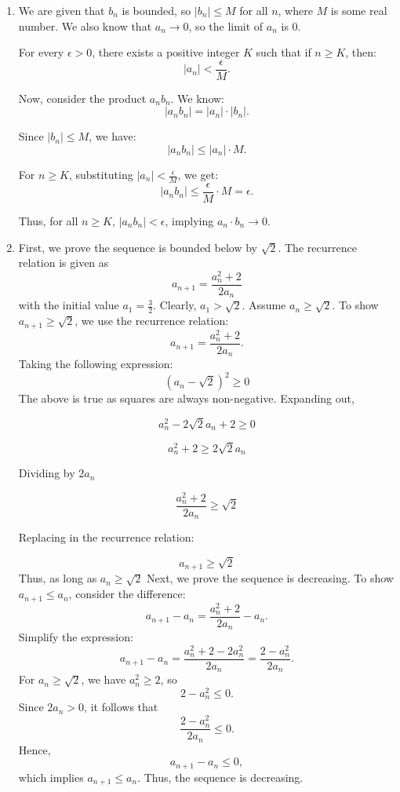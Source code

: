 \documentclass[12pt]{article}
\begin{document}
\begin{enumerate}
\item 
We are given that \(b_n\) is bounded, so \(|b_n| \leq M\) for all \(n\), where \(M\) is some real number. We also know that \(a_n \to 0\), so the limit of \(a_n\) is \(0\).


For every \(\epsilon > 0\), there exists a positive integer \(K\) such that if \(n \geq K\), then:
\[
|a_n| < \frac{\epsilon}{M}.
\]

Now, consider the product \(a_n b_n\). We know:
\[
|a_n b_n| = |a_n| \cdot |b_n|.
\]

Since \(|b_n| \leq M\), we have:
\[
|a_n b_n| \leq |a_n| \cdot M.
\]

For \(n \geq K\), substituting \(|a_n| < \frac{\epsilon}{M}\), we get:
\[
|a_n b_n| \leq \frac{\epsilon}{M} \cdot M = \epsilon.
\]

Thus, for all \(n \geq K\), \(|a_n b_n| < \epsilon\), implying $a_n \cdot b_n \to 0$.

\item First, we prove the sequence is bounded below by \(\sqrt{2}\). The recurrence relation is given as
\[
a_{n+1} = \frac{a_n^2 + 2}{2a_n}
\]
with the initial value \(a_1 = \frac{3}{2}\). Clearly, \(a_1 > \sqrt{2}\). Assume \(a_n \geq \sqrt{2}\). To show \(a_{n+1} \geq \sqrt{2}\), we use the recurrence relation:
\[
a_{n+1} = \frac{a_n^2 + 2}{2a_n}.
\]
Taking the following expression:
\[
(a_n - \sqrt{2})^2 \geq 0
\]
The above is true as squares are always non-negative.
Expanding out,

\[
a^2_{n} -2\sqrt{2}a_n + 2 \geq 0
\]

\[
a^2_{n} + 2 \geq 2\sqrt{2}a_n
\]

Dividing by $2a_n$

\[
\frac{a^2_{n} + 2}{2a_n} \geq \sqrt{2}
\]

Replacing in the recurrence relation:

\[
a_{n+1} \geq \sqrt{2}
\]
Thus, as long as $a_n \geq \sqrt{2}$
Next, we prove the sequence is decreasing. To show \(a_{n+1} \leq a_n\), consider the difference:
\[
a_{n+1} - a_n = \frac{a_n^2 + 2}{2a_n} - a_n.
\]
Simplify the expression:
\[
a_{n+1} - a_n = \frac{a_n^2 + 2 - 2a_n^2}{2a_n} = \frac{2 - a_n^2}{2a_n}.
\]
For \(a_n \geq \sqrt{2}\), we have \(a_n^2 \geq 2\), so
\[
2 - a_n^2 \leq 0.
\]
Since \(2a_n > 0\), it follows that
\[
\frac{2 - a_n^2}{2a_n} \leq 0.
\]
Hence,
\[
a_{n+1} - a_n \leq 0,
\]
which implies \(a_{n+1} \leq a_n\). Thus, the sequence is decreasing.


\end{enumerate}
\end{document}
